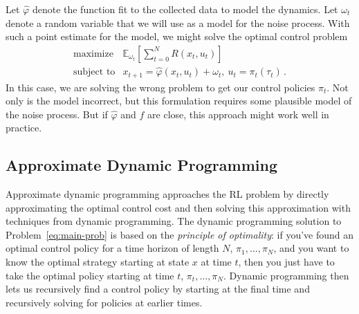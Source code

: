 \documentclass[11pt]{article}
\newcommand{\eqd}[1]{\eqref{eq:#1}}
\numberwithin{equation}{section}
\newcommand{\E}{\mathbb{E}}
\begin{document}
Let $\hat{\varphi}$ denote the function fit to the collected data to model the dynamics. Let $\omega_t$ denote a random variable that we will use as a model for the noise process. With such a point estimate for the model, we might solve the optimal control problem
\begin{equation*}\label{eq:main-prob-approx-dyn}
\begin{array}{ll}
\mbox{maximize} & \E_{\omega_t}[ \sum_{t=0}^N R(x_t,u_t)  ]\\
\mbox{subject to} &	x_{t+1} = \hat{\varphi}(x_t, u_t)+\omega_t,~u_t = \pi_t(\tau_t)\,.
\end{array}
\end{equation*}
In this case, we are solving the wrong problem to get our control policies $\pi_t$. Not only is the model incorrect, but this formulation requires some plausible model of the noise process. But if $\hat{\varphi}$ and $f$ are close, this approach might work well in practice. 

\subsection{Approximate Dynamic Programming}\label{sec:adp}

Approximate dynamic programming approaches the RL problem by directly approximating the optimal control cost and then solving this approximation with techniques from dynamic programming. The dynamic programming solution to Problem~\eqd{main-prob} is based on the \emph{principle of optimality}: if you've found an optimal control policy for a time horizon of length $N$, $\pi_1,\ldots, \pi_N$, and you want to know the optimal strategy starting at state $x$ at time $t$, then you just have to take the optimal policy starting at time $t$, $\pi_t,\ldots,\pi_N$. Dynamic programming then lets us recursively find a control policy by starting at the final time and recursively solving for policies at earlier times.
\end{document}
